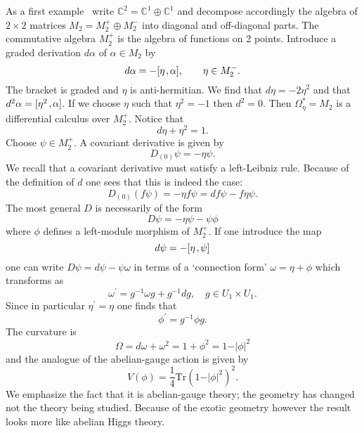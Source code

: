 \documentclass[a4paper,12pt]{article}
\def\b#1{{\mathbb #1}}
\def\tr{\mbox{Tr}}
\def\k{\kern-.1em\mathbin{,}\kern-.1em}
\begin{document}
As a first example~\cite{ConLot90} write $\b{C}^2 = \b{C}^1 \oplus \b{C}^1$ 
and decompose accordingly the algebra of $2 \times 2$ matrices
$M_2 = M_2^+ \oplus M_2^-$ into diagonal and off-diagonal parts. The
commutative algebra $M_2^+$ is the algebra of functions on 2 points.
Introduce a graded derivation $ d \alpha$ of $\alpha \in M_2$ by
$$
d \alpha = - [\eta \k \alpha], \qquad \eta \in M_2^-.
$$
The bracket is graded and $\eta$ is anti-hermitian. We find that 
$d\eta = -2\eta^2$ and that $ d^2 \alpha = [ \eta^2\k \alpha ]$. If we
choose $\eta$ such that $\eta^2 = - 1$ then $d^2 = 0$.  Then
$\Omega^*_\eta = M_2$ is a differential calculus over $M^+_2$. Notice that 
\begin{equation}
d \eta + \eta ^2 = 1.                                  \label{d-eta}
\end{equation}
Choose $\psi \in M^+_2$. A covariant derivative is given by 
\begin{equation}
D_{(0)}\psi = - \eta \psi.                              \label{sec:1}
\end{equation}
We recall that a covariant derivative must satisfy a left-Leibniz
rule. Because of the definition of $d$ one sees that this is indeed
the case:
$$
D_{(0)} (f\psi) = - \eta f\psi = df \psi - f \eta \psi.
$$
The most general $D$ is necessarily of the form 
$$
D \psi = - \eta \psi - \psi \phi
$$
where $\phi$ defines a left-module morphism of $M_2^+$. If one introduce
the map
$$
d\psi = - [\eta\k \psi]
$$
one can write $ D\psi = d\psi - \psi \omega $ in terms of a 
`connection form' $\omega = \eta + \phi$ which transforms as
$$
\omega^\prime = g^{-1} \omega g + g^{-1} dg, \quad 
g  \in U_1 \times U_1.
$$
Since in particular $ \eta^\prime = \eta$ one finds that
\begin{equation}
\phi^\prime = g^{-1} \phi g.                           \label{sec:3}
\end{equation}
The curvature is 
$$
\Omega = d\omega + \omega^2 = 1 + \phi^2  = 1 - \vert \phi \vert^2
$$
and the analogue of the abelian-gauge action is given by
$$
V(\phi) = \frac 14 \tr (1 - \vert \phi \vert^2)^2.
$$
We emphasize the fact that it is abelian-gauge theory; the geometry has
changed not the theory being studied. Because of the exotic geometry
however the result looks more like abelian Higgs theory.
\end{document}
